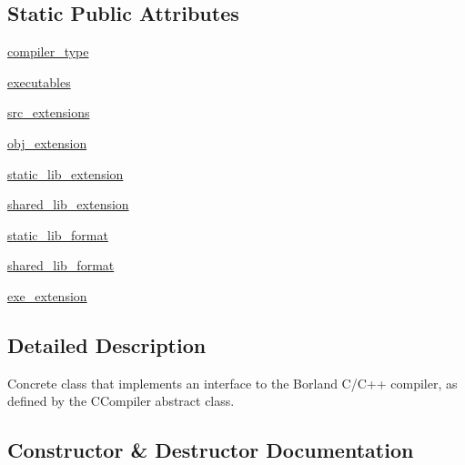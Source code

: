 \subsection*{Static Public Attributes}
\begin{DoxyCompactItemize}
\item 
\hyperlink{classsetuptools_1_1__distutils_1_1bcppcompiler_1_1BCPPCompiler_a65aa2faaa024dd15077497a1644d05f0}{compiler\+\_\+type}
\item 
\hyperlink{classsetuptools_1_1__distutils_1_1bcppcompiler_1_1BCPPCompiler_a4e41b8a2993caa55fd9cb5693e20deec}{executables}
\item 
\hyperlink{classsetuptools_1_1__distutils_1_1bcppcompiler_1_1BCPPCompiler_a2e7609700db39a2a47dc483355b1e933}{src\+\_\+extensions}
\item 
\hyperlink{classsetuptools_1_1__distutils_1_1bcppcompiler_1_1BCPPCompiler_a9965157ce0fc4aa9928f3d8c362dbea9}{obj\+\_\+extension}
\item 
\hyperlink{classsetuptools_1_1__distutils_1_1bcppcompiler_1_1BCPPCompiler_aa2e2cb2ef231bbb733799a0e9adacf51}{static\+\_\+lib\+\_\+extension}
\item 
\hyperlink{classsetuptools_1_1__distutils_1_1bcppcompiler_1_1BCPPCompiler_a5e32b1488e8afdfef3c0a502d195aa2b}{shared\+\_\+lib\+\_\+extension}
\item 
\hyperlink{classsetuptools_1_1__distutils_1_1bcppcompiler_1_1BCPPCompiler_a894053aaffe3397397fecd628e1becf7}{static\+\_\+lib\+\_\+format}
\item 
\hyperlink{classsetuptools_1_1__distutils_1_1bcppcompiler_1_1BCPPCompiler_a7c303979a5ba0a5580535920dbe56f8d}{shared\+\_\+lib\+\_\+format}
\item 
\hyperlink{classsetuptools_1_1__distutils_1_1bcppcompiler_1_1BCPPCompiler_ac229bcab43427f72189739eabf05265e}{exe\+\_\+extension}
\end{DoxyCompactItemize}


\subsection{Detailed Description}
\begin{DoxyVerb}Concrete class that implements an interface to the Borland C/C++
compiler, as defined by the CCompiler abstract class.
\end{DoxyVerb}
 

\subsection{Constructor \& Destructor Documentation}
\mbox{\label{classsetuptools_1_1__distutils_1_1bcppcompiler_1_1BCPPCompiler_ad61be5e67672f83f032b030bf9ed0855}} 
